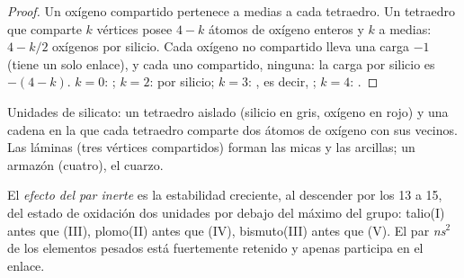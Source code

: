 \begin{proof}
Un oxígeno compartido pertenece a medias a cada tetraedro. Un tetraedro
que comparte $k$ vértices posee $4 - k$ átomos de oxígeno enteros y $k$ a
medias: $4 -
k/2$ oxígenos por silicio. Cada oxígeno no compartido lleva
una carga $-1$ (tiene un solo enlace), y cada uno compartido, ninguna: la
carga por silicio es $-(4 - k)$. $k = 0$: ; $k = 2$:
 por silicio; $k = 3$: , es decir,
; $k = 4$: .
\end{proof}

\begin{omfigure}

{\small Unidades de silicato: un tetraedro  aislado (silicio en
gris, oxígeno en rojo) y una cadena en la que cada tetraedro comparte dos
átomos de oxígeno con sus vecinos. Las láminas (tres vértices
compartidos) forman las micas y las arcillas; un armazón (cuatro), el
cuarzo.}
\end{omfigure}

\begin{definition}\label{def:b1:p-block-13-15:inert-pair}
El \emph{efecto del par inerte} es la
estabilidad creciente, al descender por los  13 a 15, del estado
de oxidación dos unidades por debajo del máximo del grupo: talio(I) antes
que (III), plomo(II) antes que (IV), bismuto(III) antes que (V). El par
\textit{ns}$^2$ de los elementos pesados está fuertemente retenido y
apenas participa en el enlace.
\end{definition}

